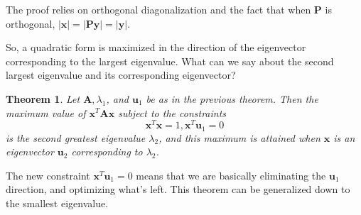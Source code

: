 \documentclass[
]{book}
\newtheorem{theorem}{Theorem}[chapter]
\theoremstyle{definition}
\theoremstyle{definition}
\theoremstyle{definition}
\theoremstyle{definition}
\theoremstyle{remark}
\begin{document}
The proof relies on orthogonal diagonalization and the fact that when \(\mathbf{P}\) is orthogonal, \(|\mathbf{x}|=|\mathbf{P}\mathbf{y}|=|\mathbf{y}|\).

So, a quadratic form is maximized in the direction of the eigenvector corresponding to the largest eigenvalue. What can we say about the second largest eigenvalue and its corresponding eigenvector?

\begin{theorembox}

\begin{theorem}
\protect\hypertarget{thm:constrainedop}{}\label{thm:constrainedop}Let \(\mathbf{A}, \lambda_1\), and \(\mathbf{u}_1\) be as in the previous theorem. Then the maximum value of \(\mathbf{x}^T\mathbf{A}\mathbf{x}\) subject to the constraints
\[\mathbf{x}^T\mathbf{x}=1,\mathbf{x}^T\mathbf{u}_1=0\]
is the second greatest eigenvalue \(\lambda_2\), and this maximum is attained when \(\mathbf{x}\) is an eigenvector \(\mathbf{u}_2\) corresponding to \(\lambda_2\)\autocite{LLM}.
\end{theorem}

\end{theorembox}

The new constraint \(\mathbf{x}^T\mathbf{u}_1=0\) means that we are basically eliminating the \(\mathbf{u}_1\) direction, and optimizing what's left. This theorem can be generalized down to the smallest eigenvalue.
\end{document}
